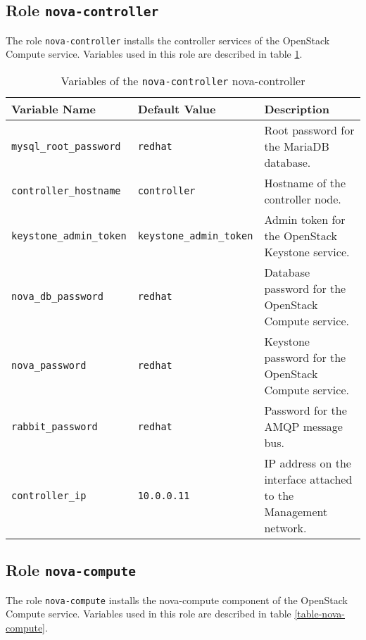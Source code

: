 \clearpage

\subsection{Role \texttt{nova-controller}}

The role \texttt{nova-controller} installs the controller services of the OpenStack Compute service. Variables used in this role are described in table \ref{table-nova-controller}.

\begin{table}[!h]
  \centering
  \begin{tabular}{|l|l|p{5cm}|}\hline
    Variable Name & Default Value & Description \\\hline

    \texttt{mysql\_root\_password} & \texttt{redhat} & Root password for the MariaDB database. \\\hline

    \texttt{controller\_hostname} & \texttt{controller} & Hostname of the controller node. \\\hline

    \texttt{keystone\_admin\_token} & \texttt{keystone\_admin\_token} & Admin token for the OpenStack Keystone service. \\\hline

    \texttt{nova\_db\_password} & \texttt{redhat} & Database password for the OpenStack Compute service. \\\hline
    \texttt{nova\_password} & \texttt{redhat} & Keystone password for the OpenStack Compute service. \\\hline
    \texttt{rabbit\_password} & \texttt{redhat} & Password for the AMQP message bus. \\\hline
    \texttt{controller\_ip} & \texttt{10.0.0.11} & IP address on the interface attached to the Management network. \\\hline
  \end{tabular}
\caption{Variables of the \texttt{nova-controller} nova-controller}
\label{table-nova-controller}
\end{table}


\subsection{Role \texttt{nova-compute}}

The role \texttt{nova-compute} installs the nova-compute component of the OpenStack Compute service. Variables used in this role are described in table \ref{table-nova-compute}.

